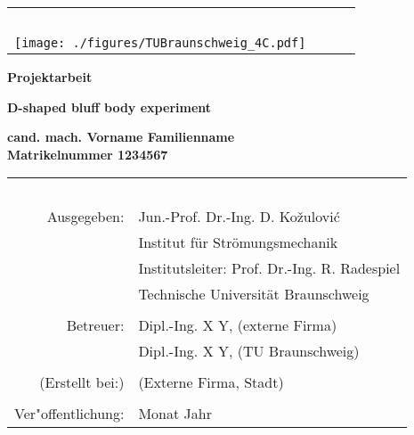 \begin{titlepage}
 \centering

\begin{table}[htbp]
 \begin{center}
 \vspace{-0.5cm}
  \begin{tabular}{lcr} 
    \parbox{0.45\textwidth}{\mbox{ }} & \parbox{0.13\textwidth}{\mbox{ }} & \parbox{0.45\textwidth}{\mbox{ }} \\
    \hspace*{-2.0cm}
    \texttt{[image: ./figures/TUBraunschweig\_4C.pdf]} & 
     &  \\ %
  \end{tabular}
 \end{center}
\end{table}


 \vspace*{2.0cm}

 \textbf{\large Projektarbeit}


 \vspace*{1.5cm}
 
 \textbf{\LARGE D-shaped bluff body experiment} \\[0.5ex]
 


 \vspace*{1.5cm}

 \textbf{\large cand. mach. Vorname Familienname} \\[0.5ex]
 \textbf{\large Matrikelnummer 1234567}


 \vspace*{7.0cm}

 \begin{table}[htbp]
  \begin{center}
   \begin{tabular}{rl} 
     \parbox{0.33\textwidth}{\mbox{ }} & \parbox{0.66\textwidth}{\mbox{ }} \\
     Ausgegeben: & Jun.-Prof. Dr.-Ing. D. Ko{\v z}ulovi{\' c} \\
                 & Institut f\" ur Str\" omungsmechanik \\
                 & Institutsleiter: Prof. Dr.-Ing. R. Radespiel \\
                 & Technische Universit\" at Braunschweig \\
                 &  \\
       Betreuer: & Dipl.-Ing. X Y, (externe Firma) \\
                 & Dipl.-Ing. X Y, (TU Braunschweig) \\
                 &  \\
 (Erstellt bei:) & (Externe Firma, Stadt) \\
                 &  \\
 Ver"offentlichung: & Monat Jahr \\
   \end{tabular}
  \end{center}
 \end{table}



\end{titlepage}

